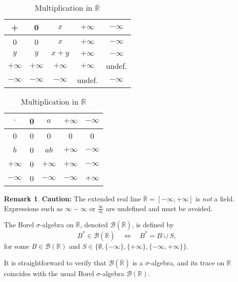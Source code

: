 \documentclass[12pt]{article}
\theoremstyle{definition}
\newtheorem{remark}{Remark}[section]
\begin{document}
\begin{table}[h]
\centering
\begin{minipage}[t]{0.45\textwidth}
\centering
\caption*{Addition in \( \overline{\mathbb{R}} \)}
\vspace{0.5em}
\begin{tabular}{c|cccc}
+ & 0 & \( x \) & \( +\infty \) & \( -\infty \) \\
\hline
0 & 0 & \( x \) & \( +\infty \) & \( -\infty \) \\
\( y \) & \( y \) & \( x+y \) & \( +\infty \) & \( -\infty \) \\
\( +\infty \) & \( +\infty \) & \( +\infty \) & \( +\infty \) & undef. \\
\( -\infty \) & \( -\infty \) & \( -\infty \) & undef. & \( -\infty \)
\end{tabular}
\end{minipage}%
\hspace{0.08\textwidth}%
\begin{minipage}[t]{0.45\textwidth}
\centering
\caption*{Multiplication in \( \overline{\mathbb{R}} \)}
\vspace{0.5em}
\begin{tabular}{c|cccc}
\( \cdot \) & 0 & \( a \) & \( +\infty \) & \( -\infty \) \\
\hline
0 & 0 & 0 & 0 & 0 \\
\( b \) & 0 & \( ab \) & \( +\infty \) & \( -\infty \) \\
\( +\infty \) & 0 & \( +\infty \) & \( +\infty \) & \( -\infty \) \\
\( -\infty \) & 0 & \( -\infty \) & \( -\infty \) & \( +\infty \)
\end{tabular}
\end{minipage}
\end{table}

\medskip
\begin{remark}
\textbf{Caution:} The extended real line \( \overline{\mathbb{R}} = [-\infty, +\infty] \) is \emph{not} a field. Expressions such as \( \infty - \infty \) or \( \frac{\infty}{\infty} \) are undefined and must be avoided.

The Borel \( \sigma \)-algebra on \( \overline{\mathbb{R}} \), denoted \( \mathcal{B}(\overline{\mathbb{R}}) \), is defined by
\[
B^* \in \mathcal{B}(\overline{\mathbb{R}}) \quad \Longleftrightarrow \quad B^* = B \cup S,
\]
for some \( B \in \mathcal{B}(\mathbb{R}) \) and \( S \in \{ \emptyset, \{-\infty\}, \{+\infty\}, \{-\infty, +\infty\} \} \).

It is straightforward to verify that \( \mathcal{B}(\overline{\mathbb{R}}) \) is a \( \sigma \)-algebra, and its trace on \( \mathbb{R} \) coincides with the usual Borel \( \sigma \)-algebra \( \mathcal{B}(\mathbb{R}) \).
\end{remark}
\end{document}
